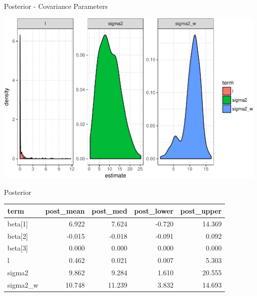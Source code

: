 \documentclass[11pt,ignorenonframetext,]{beamer}
\begin{document}
\begin{frame}{%
\protect\hypertarget{posterior---covariance-parameters-1}{%
Posterior - Covariance Parameters}}

\begin{center}\includegraphics[width=\textwidth]{Lec13_files/figure-beamer/unnamed-chunk-19-1} \end{center}

\end{frame}

\begin{frame}{%
\protect\hypertarget{posterior}{%
Posterior}}

\begin{longtable}[]{@{}lrrrr@{}}
\toprule
term & post\_mean & post\_med & post\_lower & post\_upper\tabularnewline
\midrule
\endhead
beta{[}1{]} & 6.922 & 7.624 & -0.720 & 14.369\tabularnewline
beta{[}2{]} & -0.015 & -0.018 & -0.091 & 0.092\tabularnewline
beta{[}3{]} & 0.000 & 0.000 & 0.000 & 0.000\tabularnewline
l & 0.462 & 0.021 & 0.007 & 5.303\tabularnewline
sigma2 & 9.862 & 9.284 & 1.610 & 20.555\tabularnewline
sigma2\_w & 10.748 & 11.239 & 3.832 & 14.693\tabularnewline
\bottomrule
\end{longtable}

\end{frame}
\end{document}
